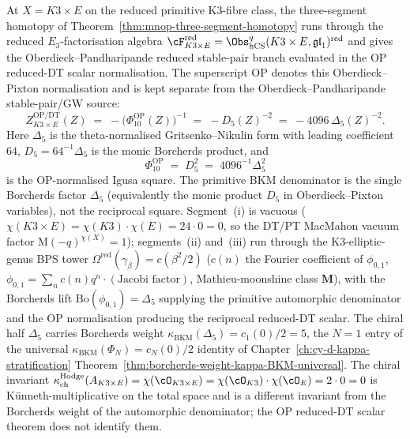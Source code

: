 \begin{proposition}
\label{prop:mnop-k3-times-e-reduced-primitive}
At $X = K3 \times E$ on the reduced primitive K3-fibre class, the
three-segment homotopy of
Theorem~\ref{thm:mnop-three-segment-homotopy} runs through the
reduced $E_3$-factorisation algebra
$\cF^{\mathrm{red}}_{K3 \times E} =
 \Obs^{q}_{\hCS}(K3 \times E, \mathfrak{gl}_{1})^{\mathrm{red}}$
and gives the Oberdieck--Pandharipande reduced stable-pair branch
evaluated in the OP reduced-DT scalar normalisation. The superscript
$\mathrm{OP}$ denotes this Oberdieck--Pixton normalisation and is kept
separate from the Oberdieck--Pandharipande stable-pair/GW source:
\[
 Z^{\mathrm{OP/DT}}_{K3 \times E}(Z)
 \;=\;
 -\bigl(\Phi_{10}^{\mathrm{OP}}(Z)\bigr)^{-1}
 \;=\;
 -D_5(Z)^{-2}
 \;=\;
 -4096\,\Delta_5(Z)^{-2}.
\]
Here $\Delta_5$ is the theta-normalised Gritsenko--Nikulin form with
leading coefficient $64$, $D_5=64^{-1}\Delta_5$ is the monic Borcherds
product, and
\[
 \Phi_{10}^{\mathrm{OP}}
 \;=\;
 D_5^2
 \;=\;
 4096^{-1}\Delta_5^2
\]
is the OP-normalised Igusa square. The primitive BKM denominator is the
single Borcherds factor $\Delta_5$ (equivalently the monic product
$D_5$ in Oberdieck--Pixton variables), not the reciprocal square.
Segment~(i) is vacuous ($\chi(K3 \times E)
 = \chi(K3) \cdot \chi(E) = 24 \cdot 0 = 0$, so the DT/PT MacMahon
vacuum factor $\mathrm{M}(-q)^{\chi(X)} = 1$); segments~(ii)
and~(iii) run through the K3-elliptic-genus BPS tower
$\Omega^{\mathrm{red}}(\gamma_\beta) = c(\beta^{2}/2)$
($c(n)$ the Fourier coefficient of $\phi_{0,1}$,
$\phi_{0,1} = \sum_{n} c(n) q^{n} \cdot (\text{Jacobi factor})$,
Mathieu-moonshine class $\mathbf{M}$), with the Borcherds lift
$\mathrm{Bo}(\phi_{0,1}) = \Delta_{5}$ supplying the primitive
automorphic denominator and the OP normalisation producing the
reciprocal reduced-DT scalar. The chiral half $\Delta_{5}$ carries Borcherds weight
$\kappa_{\mathrm{BKM}}(\Delta_{5}) = c_{1}(0)/2 = 5$, the $N = 1$ entry
of the universal
$\kappa_{\mathrm{BKM}}(\Phi_{N}) = c_{N}(0)/2$ identity of
Chapter~\ref{ch:cy-d-kappa-stratification}
Theorem~\ref{thm:borcherds-weight-kappa-BKM-universal}. The chiral
invariant
$\kappa_{\mathrm{ch}}^{\mathrm{Hodge}}(A_{K3 \times E}) = \chi(\cO_{K3 \times E})
 = \chi(\cO_{K3}) \cdot \chi(\cO_{E}) = 2 \cdot 0 = 0$
is K\"unneth-multiplicative on the total space and is a different
invariant from the Borcherds weight of the automorphic denominator;
the OP reduced-DT scalar theorem does not identify them.
\end{proposition}

